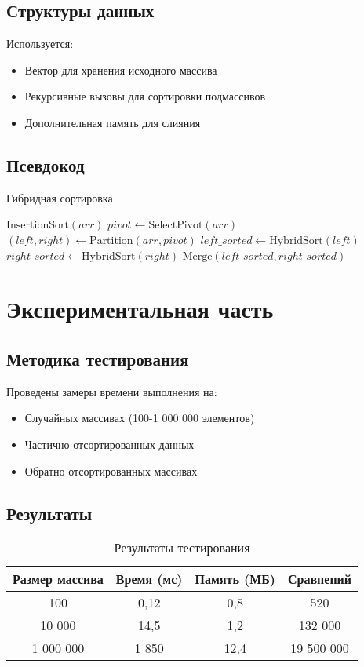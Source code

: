 \documentclass[a4paper,12pt]{article}
\begin{document}
\subsection{Структуры данных}
Используется:
\begin{itemize}
    \item Вектор для хранения исходного массива
    \item Рекурсивные вызовы для сортировки подмассивов
    \item Дополнительная память для слияния
\end{itemize}

\subsection{Псевдокод}
\begin{algorithm}[H]
\caption{Гибридная сортировка}
\begin{algorithmic}[1]
        \State \Return $\text{InsertionSort}(arr)$
    \EndIf
    \State $pivot \gets \text{SelectPivot}(arr)$
    \State $(left, right) \gets \text{Partition}(arr, pivot)$
    \State $left\_sorted \gets \text{HybridSort}(left)$
    \State $right\_sorted \gets \text{HybridSort}(right)$
    \State \Return $\text{Merge}(left\_sorted, right\_sorted)$
\EndFunction
\end{algorithmic}
\end{algorithm}

\section{Экспериментальная часть}
\subsection{Методика тестирования}
Проведены замеры времени выполнения на:
\begin{itemize}
    \item Случайных массивах (100-1 000 000 элементов)
    \item Частично отсортированных данных
    \item Обратно отсортированных массивах
\end{itemize}

\subsection{Результаты}
\begin{table}[h]
\centering
\begin{tabular}{|c|c|c|c|}
\hline
Размер массива & Время (мс) & Память (МБ) & Сравнений \\
\hline
100 & 0,12 & 0,8 & 520 \\
10 000 & 14,5 & 1,2 & 132 000 \\
1 000 000 & 1 850 & 12,4 & 19 500 000 \\
\hline
\end{tabular}
\caption{Результаты тестирования}
\end{table}
\end{document}
